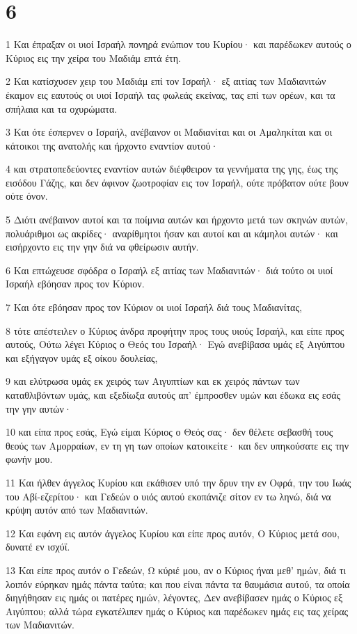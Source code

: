 \chapter{6}

\par 1 Και έπραξαν οι υιοί Ισραήλ πονηρά ενώπιον του Κυρίου· και παρέδωκεν αυτούς ο Κύριος εις την χείρα του Μαδιάμ επτά έτη.
\par 2 Και κατίσχυσεν χειρ του Μαδιάμ επί τον Ισραήλ· εξ αιτίας των Μαδιανιτών έκαμον εις εαυτούς οι υιοί Ισραήλ τας φωλεάς εκείνας, τας επί των ορέων, και τα σπήλαια και τα οχυρώματα.
\par 3 Και ότε έσπερνεν ο Ισραήλ, ανέβαινον οι Μαδιανίται και οι Αμαληκίται και οι κάτοικοι της ανατολής και ήρχοντο εναντίον αυτού·
\par 4 και στρατοπεδεύοντες εναντίον αυτών διέφθειρον τα γεννήματα της γης, έως της εισόδου Γάζης, και δεν άφινον ζωοτροφίαν εις τον Ισραήλ, ούτε πρόβατον ούτε βουν ούτε όνον.
\par 5 Διότι ανέβαινον αυτοί και τα ποίμνια αυτών και ήρχοντο μετά των σκηνών αυτών, πολυάριθμοι ως ακρίδες· αναρίθμητοι ήσαν και αυτοί και αι κάμηλοι αυτών· και εισήρχοντο εις την γην διά να φθείρωσιν αυτήν.
\par 6 Και επτώχευσε σφόδρα ο Ισραήλ εξ αιτίας των Μαδιανιτών· διά τούτο οι υιοί Ισραήλ εβόησαν προς τον Κύριον.
\par 7 Και ότε εβόησαν προς τον Κύριον οι υιοί Ισραήλ διά τους Μαδιανίτας,
\par 8 τότε απέστειλεν ο Κύριος άνδρα προφήτην προς τους υιούς Ισραήλ, και είπε προς αυτούς, Ούτω λέγει Κύριος ο Θεός του Ισραήλ· Εγώ ανεβίβασα υμάς εξ Αιγύπτου και εξήγαγον υμάς εξ οίκου δουλείας,
\par 9 και ελύτρωσα υμάς εκ χειρός των Αιγυπτίων και εκ χειρός πάντων των καταθλιβόντων υμάς, και εξεδίωξα αυτούς απ' έμπροσθεν υμών και έδωκα εις εσάς την γην αυτών·
\par 10 και είπα προς εσάς, Εγώ είμαι Κύριος ο Θεός σας· δεν θέλετε σεβασθή τους θεούς των Αμορραίων, εν τη γη των οποίων κατοικείτε· και δεν υπηκούσατε εις την φωνήν μου.
\par 11 Και ήλθεν άγγελος Κυρίου και εκάθισεν υπό την δρυν την εν Οφρά, την του Ιωάς του Αβί-εζερίτου· και Γεδεών ο υιός αυτού εκοπάνιζε σίτον εν τω ληνώ, διά να κρύψη αυτόν από των Μαδιανιτών.
\par 12 Και εφάνη εις αυτόν άγγελος Κυρίου και είπε προς αυτόν, Ο Κύριος μετά σου, δυνατέ εν ισχύϊ.
\par 13 Και είπε προς αυτόν ο Γεδεών, Ω κύριέ μου, αν ο Κύριος ήναι μεθ' ημών, διά τι λοιπόν εύρηκαν ημάς πάντα ταύτα; και που είναι πάντα τα θαυμάσια αυτού, τα οποία διηγήθησαν εις ημάς οι πατέρες ημών, λέγοντες, Δεν ανεβίβασεν ημάς ο Κύριος εξ Αιγύπτου; αλλά τώρα εγκατέλιπεν ημάς ο Κύριος και παρέδωκεν ημάς εις τας χείρας των Μαδιανιτών.
